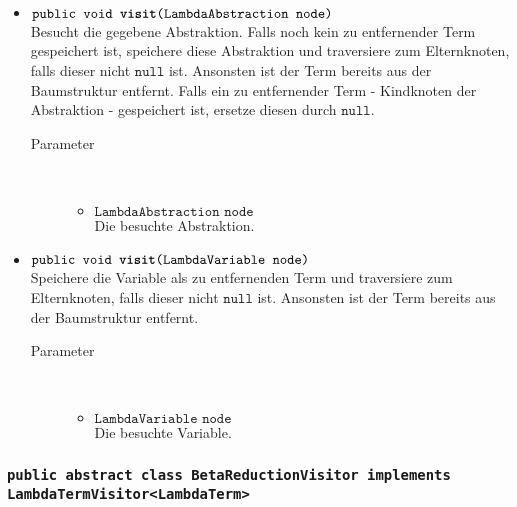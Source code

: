 \begin{description}
\begin{itemize}
		\item $\texttt{public void \textbf{visit}(LambdaAbstraction node)}$ \\ Besucht die gegebene Abstraktion. Falls noch kein zu entfernender Term gespeichert ist, speichere diese Abstraktion und traversiere zum Elternknoten, falls dieser nicht $\texttt{null}$ ist. Ansonsten ist der Term bereits aus der Baumstruktur entfernt. Falls ein zu entfernender Term - Kindknoten der Abstraktion - gespeichert ist, ersetze diesen durch $\texttt{null}$.
		\begin{description}
			\item[Parameter] \hfill \\
			\vspace{-.8cm}
			\begin{itemize}
				\item $\texttt{LambdaAbstraction node}$ \\ Die besuchte Abstraktion.
			\end{itemize}
		\end{description}
		
		\item $\texttt{public void \textbf{visit}(LambdaVariable node)}$ \\ Speichere die Variable als zu entfernenden Term und traversiere zum Elternknoten, falls dieser nicht $\texttt{null}$ ist. Ansonsten ist der Term bereits aus der Baumstruktur entfernt.
		\begin{description}
			\item[Parameter] \hfill \\
			\vspace{-.8cm}
			\begin{itemize}
				\item $\texttt{LambdaVariable node}$ \\ Die besuchte Variable.
			\end{itemize}
		\end{description}
	\end{itemize}
\end{description}

\subsubsection{\normalfont \texttt{public abstract class \textbf{BetaReductionVisitor} implements LambdaTermVisitor<LambdaTerm>}}

